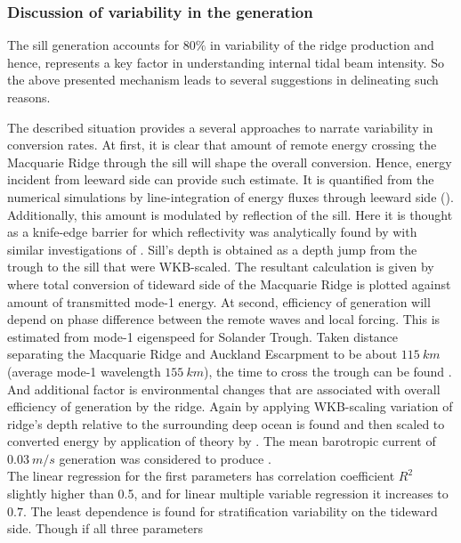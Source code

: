 \documentclass[12pt]{article}
\begin{document}
\subsubsection{Discussion of variability in the generation}
The sill generation accounts for $80\%$ in variability of the ridge production and hence, 
represents a key factor in understanding internal tidal beam intensity. So the above presented 
mechanism leads to several suggestions in delineating such reasons. 

The described situation provides a several approaches to narrate variability in conversion rates. 
At first, it is clear that amount of remote energy crossing the Macquarie Ridge through the sill 
will 
shape the overall conversion. Hence, energy incident from leeward side can provide such 
estimate. It is quantified from the numerical simulations by line-integration of energy fluxes 
through leeward side (). Additionally, this amount is modulated by reflection of 
the 
sill. Here it is thought as a knife-edge barrier for which reflectivity was analytically found by  
\citep{larsen1969internal} with similar investigations of \citep{klymak2013parameterizing}.  
Sill's depth is obtained as a depth jump from the trough to the sill that were WKB-scaled. The 
resultant calculation is given by  where total conversion of tideward 
side 
of the Macquarie Ridge is plotted against amount of transmitted mode-1 energy. At second, 
efficiency 
of generation will depend on phase difference between the remote waves and local forcing. This is 
estimated from mode-1 eigenspeed for Solander Trough. Taken distance separating the Macquarie Ridge 
and Auckland Escarpment to be about $115~km$ (average mode-1 wavelength $155~km$), the time to 
cross the trough can be found . And additional factor is environmental 
changes that are associated with overall efficiency of generation by the ridge. Again by applying 
WKB-scaling variation of ridge's depth relative to the surrounding deep ocean is found and then 
scaled to converted energy by application of theory by \citep{st2003generation}. The 
mean barotropic current of $0.03~m/s$ generation was considered to produce 
.\\
The linear regression for the first parameters has correlation coefficient $R^2$ slightly higher 
than 0.5, and for linear multiple variable regression it increases to $0.7$. The least dependence 
is found for stratification variability on the tideward side. Though if all three parameters 
\end{document}
